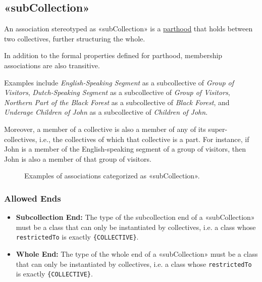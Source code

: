 


\subsection{«subCollection»}
\label{stereotype:subCollection}

An association stereotyped as «subCollection» is a \hyperref[stereotype:parthood]{parthood} that holds between two collectives, further structuring the whole. 

In addition to the formal properties defined for parthood, membership associations are also transitive.

Examples include \textit{English-Speaking Segment} as a subcollective of \textit{Group of Visitors}, \textit{Dutch-Speaking Segment} as a subcollective of \textit{Group of Visitors}, \textit{Northern Part of the Black Forest} as a subcollective of \textit{Black Forest}, and \textit{Underage Children of John} as a subcollective of \textit{Children of John}.

Moreover, a member of a collective is also a member of any of its super-collectives, i.e., the collectives of which that collective is a part. For instance, if John is a member of the English-speaking segment of a group of visitors, then John is also a member of that group of visitors.

\begin{figure}[h]
    \centering
    
    \caption{Examples of associations categorized as «subCollection».}
    \label{fig:subCollection-example}
\end{figure}


\subsubsection{Allowed Ends}

\begin{itemize}
    \item \textbf{Subcollection End:} The type of the subcollection end of a «subCollection» must be a class that can only be instantiated by collectives, i.e. a class whose  \texttt{restrictedTo} is exactly \texttt{\{COLLECTIVE\}}.
    \item \textbf{Whole End:} The type of the whole end of a «subCollection» must be a class that can only be instantiated by collectives, i.e. a class whose  \texttt{restrictedTo} is exactly \texttt{\{COLLECTIVE\}}.
\end{itemize}

